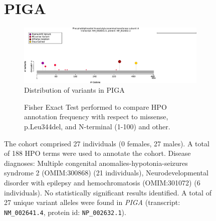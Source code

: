 \begin{figure}[htbp]
\section*{PIGA}
\centering
\begin{subfigure}[b]{0.95\textwidth}
\centering
\includegraphics[width=\textwidth]{ img/PIGA_protein_diagram.pdf} 
\captionsetup{justification=raggedright,singlelinecheck=false}
\caption{Distribution of variants in PIGA}
\end{subfigure}

\vspace{2em}

\begin{subfigure}[b]{0.95\textwidth}
\centering
{}
\captionsetup{justification=raggedright,singlelinecheck=false}
\caption{Fisher Exact Test performed to compare HPO annotation frequency with respect to missense, p.Leu344del, and N-terminal (1-100) and other. }
\end{subfigure}


\vspace{2em}

\caption{The cohort comprised 27 individuals (0 females, 27 males). A total of 188 HPO terms were used to annotate the cohort. Disease diagnoses: Multiple congenital anomalies-hypotonia-seizures syndrome 2 (OMIM:300868) (21 individuals), Neurodevelopmental disorder with epilepsy and hemochromatosis (OMIM:301072) (6 individuals). No statistically significant results identified. A total of 27 unique variant alleles were found in \textit{PIGA} (transcript: \texttt{NM\_002641.4}, protein id: \texttt{NP\_002632.1}).}
\end{figure}
